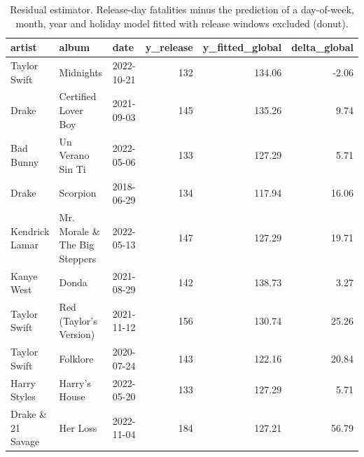 \begin{table}
\caption{Residual estimator. Release-day fatalities minus the prediction of a day-of-week, month, year and holiday model fitted with release windows excluded (donut).}
\begin{tabular}{lllrrr}
\toprule
artist & album & date & y\_release & y\_fitted\_global & delta\_global \\
\midrule
Taylor Swift & Midnights & 2022-10-21 & 132 & 134.06 & -2.06 \\
Drake & Certified Lover Boy & 2021-09-03 & 145 & 135.26 & 9.74 \\
Bad Bunny & Un Verano Sin Ti & 2022-05-06 & 133 & 127.29 & 5.71 \\
Drake & Scorpion & 2018-06-29 & 134 & 117.94 & 16.06 \\
Kendrick Lamar & Mr. Morale \& The Big Steppers & 2022-05-13 & 147 & 127.29 & 19.71 \\
Kanye West & Donda & 2021-08-29 & 142 & 138.73 & 3.27 \\
Taylor Swift & Red (Taylor's Version) & 2021-11-12 & 156 & 130.74 & 25.26 \\
Taylor Swift & Folklore & 2020-07-24 & 143 & 122.16 & 20.84 \\
Harry Styles & Harry's House & 2022-05-20 & 133 & 127.29 & 5.71 \\
Drake \& 21 Savage & Her Loss & 2022-11-04 & 184 & 127.21 & 56.79 \\
\bottomrule
\end{tabular}
\end{table}
